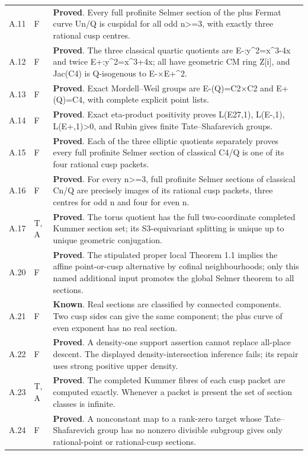 \begin{longtable}{@{}p{}p{}p{}@{}}
A.11 & F & \textbf{Proved}. Every full profinite Selmer section of the plus Fermat curve Un/Q is cuspidal for all odd n\textgreater{}=3, with exactly three rational cusp centres. \\
A.12 & F & \textbf{Proved}. The three classical quartic quotients are E-:y\textasciicircum{}2=x\textasciicircum{}3-4x and twice E+:y\textasciicircum{}2=x\textasciicircum{}3+4x; all have geometric CM ring Z[i], and Jac(C4) is Q-isogenous to E-×E+\textasciicircum{}2. \\
A.13 & F & \textbf{Proved}. Exact Mordell--Weil groups are E-(Q)=C2×C2 and E+(Q)=C4, with complete explicit point lists. \\
A.14 & F & \textbf{Proved}. Exact eta-product positivity proves L(E27,1), L(E-,1), L(E+,1)\textgreater{}0, and Rubin gives finite Tate--Shafarevich groups. \\
A.15 & F & \textbf{Proved}. Each of the three elliptic quotients separately proves every full profinite Selmer section of classical C4/Q is one of its four rational cusp packets. \\
A.16 & F & \textbf{Proved}. For every n\textgreater{}=3, full profinite Selmer sections of classical Cn/Q are precisely images of its rational cusp packets, three centres for odd n and four for even n. \\
A.17 & T, A & \textbf{Proved}. The torus quotient has the full two-coordinate completed Kummer section set; its S3-equivariant splitting is unique up to unique geometric conjugation. \\
A.20 & F & \textbf{Proved}. The stipulated proper local Theorem 1.1 implies the affine point-or-cusp alternative by cofinal neighbourhoods; only this named additional input promotes the global Selmer theorem to all sections. \\
A.21 & F & \textbf{Known}. Real sections are classified by connected components. Two cusp sides can give the same component; the plus curve of even exponent has no real section. \\
A.22 & F & \textbf{Proved}. A density-one support assertion cannot replace all-place descent. The displayed density-intersection inference fails; its repair uses strong positive upper density. \\
A.23 & T, A & \textbf{Proved}. The completed Kummer fibres of each cusp packet are computed exactly. Whenever a packet is present the set of section classes is infinite. \\
A.24 & F & \textbf{Proved}. A nonconstant map to a rank-zero target whose Tate--Shafarevich group has no nonzero divisible subgroup gives only rational-point or rational-cusp sections. \\

\end{longtable}
